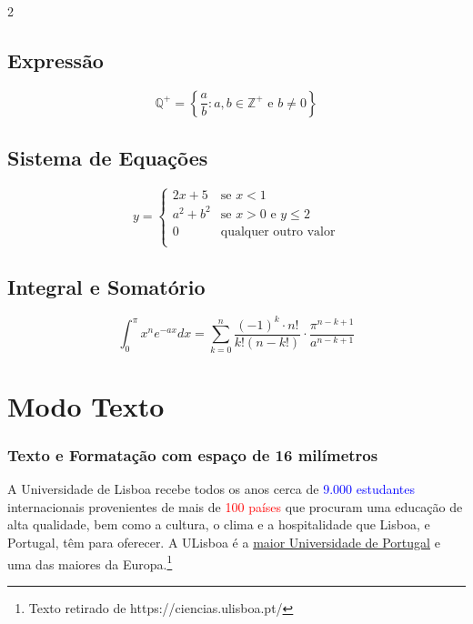 \documentclass[12pt,a4paper]{article}
\begin{document}
\begin{multicols}{2}
\subsection{Expressão}
$$
\mathbb{Q}^+ = \left\{\frac{a}{b}:a,b \in\mathbb{Z}^+ \text{ e }b\neq0\right\}$$

\subsection{Sistema de Equações}
$$
y = \begin{cases} 
2x+5 & \text{se } x<1\\
a^2+b^2 & \text{se } x>0 \text{ e } y\leq2\\
0 & \text{qualquer outro valor}\\
\end{cases} $$
\end{multicols}
\vspace{1cm}

\subsection{Integral e Somatório}
$$
\int_0^{\pi} x^ne^{-ax}dx= \sum_{k=0}^{n}\dfrac{(-1)^k\cdot n!}{k!(n-k!)} \cdot \dfrac{\pi^{n-k+1}}{a^{n-k+1}} $$
\newpage

\section*{\Huge Modo Texto}
\subsubsection{Texto e Formatação com espaço de 16 milímetros}
\hskip 16mm A Universidade de {\large Lisboa} recebe todos os anos cerca de \textcolor{blue}{9.000 estudantes} internacionais provenientes de mais de \textcolor{red}{100 países} que procuram uma educação de alta qualidade, bem como a cultura, o clima e a hospitalidade que Lisboa, e {\Huge Portugal}, têm para oferecer. A ULisboa é a
\underline{maior Universidade de Portugal} e uma das maiores da {\Huge Europa}.\footnote{Texto retirado de https://ciencias.ulisboa.pt/}
\end{document}
